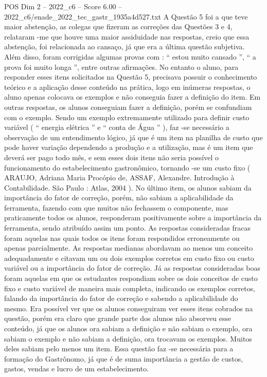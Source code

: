 \begin{textsample}{POS Dim 2 – 2022\_c6 – Score 6.00 – 2022\_c6/enade\_2022\_tec\_gastr\_1935a4d527.txt}
A Questão 5 foi a que teve maior abstenção, as colegas que fizeram as correções das Questões 3 e 4, relataram -me que houve uma maior assiduidade nas respostas, creio que essa abstenção, foi relacionada ao cansaço, já que era a última questão subjetiva.
Além disso, foram corrigidas algumas provas com : “ estou muito cansado ”, “ a prova foi muito longa ”, entre outras afirmações.
No entanto o aluno, para responder esses itens solicitados na Questão 5, precisava possuir o conhecimento teórico e a aplicação desse conteúdo na prática, logo em inúmeras respostas, o aluno apenas colocava os exemplos e não conseguia fazer a definição do item.
Em outras respostas, os alunos conseguiam fazer a definição, porém se confundiam com o exemplo.
Sendo um exemplo extremamente utilizado para definir custo variável ( “ energia elétrica ” e “ conta de Água ” ), faz -se necessário a observação de um entendimento lógico, já que é um item na planilha de custo que pode haver variação dependendo a produção e a utilização, mas é um item que deverá ser pago todo mês, e sem esses dois itens não seria possível o funcionamento do estabelecimento gastronômico, tornando -se um custo fixo ( ARAUJO, Adriana Maria Procópio de, ASSAF, Alexandre.
Introdução à Contabilidade.
São Paulo : Atlas, 2004 ).
No último item, os alunos sabiam da importância do fator de correção, porém, não sabiam a aplicabilidade da ferramenta, fazendo com que muitos não fechassem o componente, mas praticamente todos os alunos, responderam positivamente sobre a importância da ferramenta, sendo atribuído assim um ponto.
As respostas consideradas fracas foram aquelas nas quais todos os itens foram respondidos erroneamente ou apenas parcialmente.
As respostas medianas abordavam ao menos um conceito adequadamente e citavam um ou dois exemplos corretos em custo fixo ou custo variável ou a importância do fator de correção.
Já as respostas consideradas boas foram aquelas em que os estudantes respondiam sobre os dois conceitos de custo fixo e custo variável de maneira mais completa, indicando os exemplos corretos, falando da importância do fator de correção e sabendo a aplicabilidade do mesmo.
Era possível ver que os alunos conseguiram ver esses itens cobrados na questão, porém era claro que grande parte dos alunos não absorveu esse conteúdo, já que os alunos ora sabiam a definição e não sabiam o exemplo, ora sabiam o exemplo e não sabiam a definição, ora trocavam os exemplos.
Muitos deles sabiam pelo menos um item.
Essa questão faz -se necessária para a formação do Gastrônomo, já que é de suma importância a gestão de custos, gastos, vendas e lucro de um estabelecimento.

\end{textsample}
